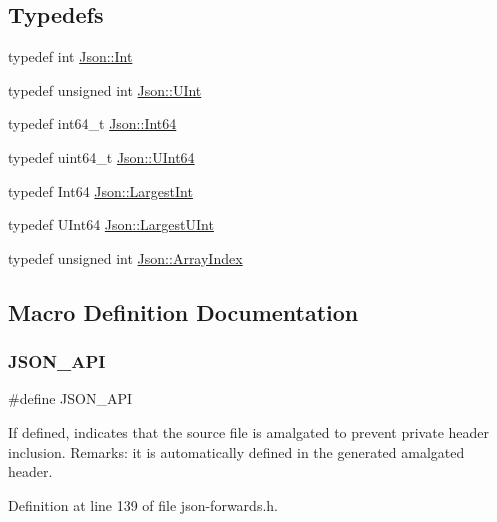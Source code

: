 \subsection*{Typedefs}
\begin{DoxyCompactItemize}
\item 
typedef int \hyperlink{namespace_json_a08122e8005b706d982e48cca1e2119c7}{Json\+::\+Int}
\item 
typedef unsigned int \hyperlink{namespace_json_a800fb90eb6ee8d5d62b600c06f87f7d4}{Json\+::\+U\+Int}
\item 
typedef int64\+\_\+t \hyperlink{namespace_json_ac62566f36fd33115957b91305c9ed1dc}{Json\+::\+Int64}
\item 
typedef uint64\+\_\+t \hyperlink{namespace_json_adf3fa5cb60c619e4f02315ad355e0ca1}{Json\+::\+U\+Int64}
\item 
typedef Int64 \hyperlink{namespace_json_a218d880af853ce786cd985e82571d297}{Json\+::\+Largest\+Int}
\item 
typedef U\+Int64 \hyperlink{namespace_json_ae202ecad69725e23443f465e257456d0}{Json\+::\+Largest\+U\+Int}
\item 
typedef unsigned int \hyperlink{namespace_json_a8048e741f2177c3b5d9ede4a5b8c53c2}{Json\+::\+Array\+Index}
\end{DoxyCompactItemize}


\subsection{Macro Definition Documentation}
\hypertarget{json-forwards_8h_a1d61ffde86ce1a18fd83194ff0d9a206}{}\label{json-forwards_8h_a1d61ffde86ce1a18fd83194ff0d9a206} 
\subsubsection{\texorpdfstring{J\+S\+O\+N\+\_\+\+A\+PI}{JSON\_API}}
{\footnotesize\ttfamily \#define J\+S\+O\+N\+\_\+\+A\+PI}

If defined, indicates that the source file is amalgated to prevent private header inclusion. Remarks\+: it is automatically defined in the generated amalgated header. 

Definition at line 139 of file json-\/forwards.\+h.

\hypertarget{json-forwards_8h_a71f1a94bee4773f2a6e30eeac7deb963}{}\label{json-forwards_8h_a71f1a94bee4773f2a6e30eeac7deb963} 
